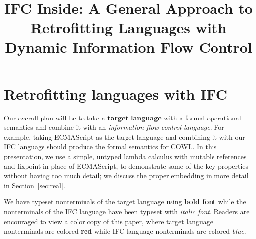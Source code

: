 \documentclass{sigplanconf}
\begin{document}







\title{
IFC Inside: A General Approach to Retrofitting Languages with Dynamic Information Flow Control
}


\maketitle



\section{Retrofitting languages with IFC}
\label{sec:retrofit}

Our overall plan will be to take a \textbf{{\color{red} target
language}} with a formal operational semantics and combine it with an
\textit{{\color{blue} information flow control language}}.  For example,
taking ECMAScript as the target language and combining it with our IFC
language should produce the formal semantics for COWL.  In this
presentation, we use a simple, untyped lambda calculus with mutable
references and fixpoint in place of ECMAScript, to demonstrate some of the key
properties without having too much detail; we discuss the proper
embedding in more detail in Section~\ref{sec:real}.

We have typeset nonterminals of the target language using \textbf{{\color{red}
bold font}} while the nonterminals of the IFC language have been typeset
with \textit{{\color{blue} italic font}}.  Readers are encouraged to view
a color copy of this paper, where target language nonterminals are colored \textbf{{\color{red} red}}
while IFC language nonterminals are colored \textit{{\color{blue} blue}}.
\end{document}
